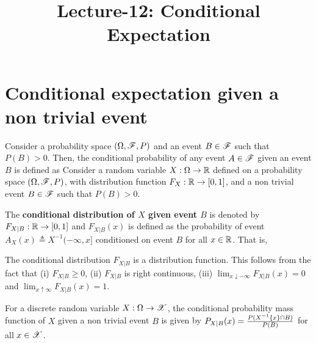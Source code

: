 \documentclass[letterpaper,10pt,english]{article}
\title{Lecture-12: Conditional Expectation}
\author{}
\begin{document}
\maketitle

\section{Conditional expectation given a non trivial event}
Consider a probability space $(\Omega, \mathscr{F}, P)$ and an event $B \in \mathscr{F}$ such that $P(B) > 0$. 
Then, the conditional probability of any event $A \in \mathscr{F}$ given an event $B$ is defined as
Consider a random variable $X: \Omega\to\mathbb{R}$ defined on a probability space $(\Omega, \mathscr{F}, P)$, 
with distribution function $F_X: \mathbb{R} \to [0,1]$, 
and a non trivial event $B \in \mathscr{F}$ such that $P(B) > 0$. 
\begin{defn}%
The \textbf{conditional distribution of $X$ given event $B$} is denoted by $F_{X| B}: \mathbb{R} \to [0,1]$ 
and $F_{X| B}(x)$ is defined as the probability of event $A_X(x) \triangleq X^{-1}(-\infty, x]$ conditioned on event $B$ for all $x\in\mathbb{R}$. 
That is, 
\end{defn}
\begin{rem} 
The conditional distribution $F_{X|B}$ is a distribution function. 
This follows from the fact that 
(i) $F_{X|B} \ge 0$,
(ii) $F_{X|B}$ is right continuous,  
(iii) $\lim_{x\downarrow -\infty}F_{X|B}(x) = 0$ and $\lim_{x\uparrow \infty}F_{X|B}(x) = 1$.
\end{rem}
\begin{rem}
For a discrete random variable $X:\Omega\to\mathscr{X}$, the conditional probability mass function of $X$ given a non trivial event $B$ is given by $P_{X|B}(x) = \frac{P(X^{-1}\left\{x\right\}\cap B)}{P(B)}$ for all $x \in \mathscr{X}$. 
\end{rem}
\end{document}

